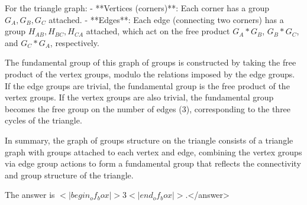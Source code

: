 For the triangle graph:  
- **Vertices (corners)**: Each corner has a group \( G_A, G_B, G_C \) attached.  
- **Edges**: Each edge (connecting two corners) has a group \( H_{AB}, H_{BC}, H_{CA} \) attached, which act on the free product \( G_A * G_B \), \( G_B * G_C \), and \( G_C * G_A \), respectively.  

The fundamental group of this graph of groups is constructed by taking the free product of the vertex groups, modulo the relations imposed by the edge groups. If the edge groups are trivial, the fundamental group is the free product of the vertex groups. If the vertex groups are also trivial, the fundamental group becomes the free group on the number of edges (3), corresponding to the three cycles of the triangle.  

In summary, the graph of groups structure on the triangle consists of a triangle graph with groups attached to each vertex and edge, combining the vertex groups via edge group actions to form a fundamental group that reflects the connectivity and group structure of the triangle.  

The answer is \(<|begin_of_box|>3<|end_of_box|>\).</answer>